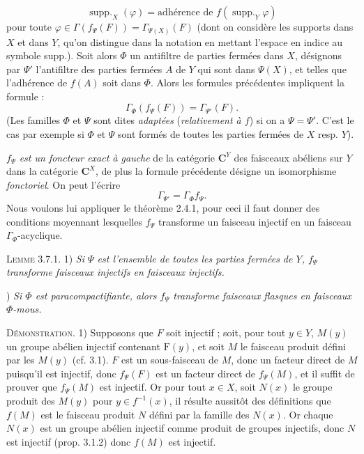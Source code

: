 
\[
\operatorname{supp.}_{X}(\varphi)
=\text{adhérence de }f(\operatorname{supp.}_{Y}\varphi)
\]
pour toute $\varphi\in\Gamma(f_\Psi(F))=\Gamma_{\Psi(X)}(F)$ (dont on
considère les supports dans $X$ et dans $Y$, qu'on distingue dans la notation
en mettant l'espace en indice au symbole supp.).
Soit alors $\Phi$ un antifiltre de parties fermées dans $X$, désignons par
$\Psi'$ l'antifiltre des parties fermées $A$ de $Y$ qui sont dans $\Psi(X)$,
et telles que l'adhérence de $f(A)$ soit dans $\Phi$. Alors les formules
précédentes impliquent la formule :
\[
\Gamma_\Phi(f_\Psi(F))=\Gamma_{\Psi'}(F).
\]
(Les familles $\Phi$ et $\Psi$ sont dites \textit{adaptées} (\textit{relativement à
$f$}) si on a $\Psi=\Psi'$. C'est le cas par exemple si $\Phi$ et $\Psi$ sont
formés de toutes les parties fermées de $X$ resp. $Y$).

\textit{$f_\Psi$ est un foncteur exact à gauche} de la catégorie $\mathbf C^Y$ des
faisceaux abéliens sur $Y$ dans la catégorie $\mathbf C^X$, de plus la formule
précédente désigne un isomorphisme \textit{fonctoriel}. On peut l'écrire
\[
\Gamma_{\Psi'}=\Gamma_\Phi f_\Psi.
\]
Nous voulons lui appliquer le théorème 2.4.1, pour ceci il faut donner des
conditions moyennant lesquelles $f_\Psi$ transforme un faisceau injectif en
un faisceau $\Gamma_\Phi$-acyclique.

\indent\textsc{Lemme 3.7.1.}
1) \textit{Si $\Psi$ est l'ensemble de toutes les parties
fermées de $Y$, $f_\Psi$ transforme faisceaux injectifs en faisceaux
injectifs.}

) \textit{Si $\Phi$ est paracompactifiante, alors $f_\Psi$
transforme faisceaux flasques en faisceaux $\Phi$-mous.}

\indent\textsc{Démonstration.} 1) Supposons que $F$ soit injectif ; soit,
pour tout $y\in Y$, $M(y)$ un groupe abélien injectif contenant $\mathrm F(y)$, et
soit $M$ le faisceau produit défini par les $M(y)$ (cf. 3.1). $F$ est un
sous-faisceau de $M$, donc un facteur direct de $M$ puisqu'il est injectif,
donc $f_\Psi(F)$ est un facteur direct de $f_\Psi(M)$, et il suffit de prouver
que $f_\Psi(M)$ est injectif.
Or pour tout $x\in X$, soit $N(x)$ le groupe produit des $M(y)$ pour
$y\in f^{-1}(x)$, il résulte aussitôt des définitions que $f(M)$ est le
faisceau produit $N$ défini par la famille des $N(x)$. Or chaque $N(x)$ est un
groupe abélien injectif comme produit de groupes injectifs, donc $N$ est
injectif (prop. 3.1.2) donc $f(M)$ est injectif.

